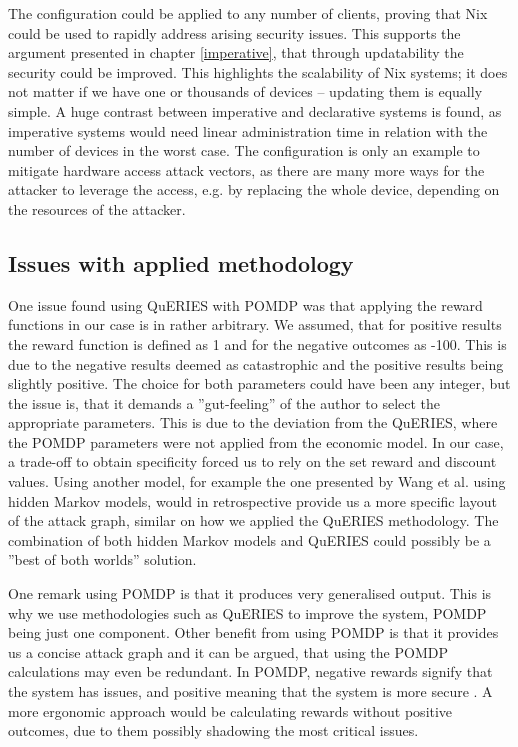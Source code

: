 The configuration could be applied to any number of clients, proving
that Nix could be used to rapidly address arising security
issues. This supports the argument presented in chapter
\ref{imperative}, that through updatability the security could be
improved. This highlights the scalability of Nix systems; it does not
matter if we have one or thousands of devices – updating them is
equally simple. A huge contrast between imperative and declarative
systems is found, as imperative systems would need linear
administration time in relation with the number of devices in the worst case. The
configuration is only an example to mitigate hardware access attack
vectors, as there are many more ways for the attacker to leverage the
access, e.g. by replacing the whole device, depending on the resources
of the attacker.

\subsection{Issues with applied methodology} \label{issues}

One issue found using QuERIES with POMDP was that applying the reward
functions in our case is in rather arbitrary. We assumed, that for
positive results the reward function is defined as 1 and for the
negative outcomes as -100. This is due to the negative results deemed
as catastrophic and the positive results being slightly positive. The
choice for both parameters could have been any integer, but the issue
is, that it demands a ''gut-feeling'' of the author to select the
appropriate parameters. This is due to the deviation from the QuERIES,
where the POMDP parameters were not applied from the economic model. In our case, a trade-off to obtain
specificity forced us to rely on the set reward and discount
values. Using another model, for example the one presented by Wang
et al. \cite{wang2010framework} using hidden Markov models, would in retrospective provide us a
more specific layout of the attack graph, similar on how we applied
the QuERIES methodology. The
combination of both hidden Markov models and QuERIES could possibly be a ''best
of both worlds'' solution.

One remark using POMDP is that it produces very generalised
output. This is why we use methodologies such as QuERIES to improve
the system, POMDP being just one component. Other benefit from using
POMDP is that it provides us a concise attack graph and it can be argued, that
using the POMDP calculations may even be redundant. In POMDP, negative
rewards signify that the system has issues, and positive meaning that
the system is more secure \cite{mcabeeMarkov}. A more ergonomic approach
would be calculating rewards without positive outcomes, due to them
possibly shadowing the most critical issues.

